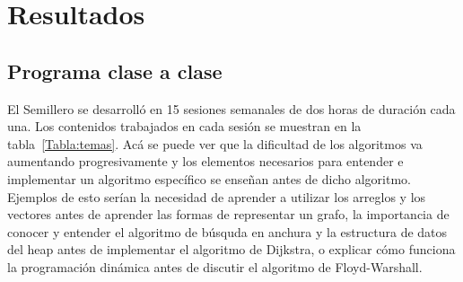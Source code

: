 \documentclass[conference]{IEEEtran}
\begin{document}
\section{Resultados}

\subsection{Programa clase a clase}
El Semillero se desarrolló en 15 sesiones semanales de dos horas de duración cada una. Los contenidos trabajados en cada sesión se muestran en la tabla~\ref{Tabla:temas}. Acá se puede ver que la dificultad de los algoritmos va aumentando progresivamente y los elementos necesarios para entender e implementar un algoritmo específico se enseñan antes de dicho algoritmo. Ejemplos de esto serían la necesidad de aprender a utilizar los arreglos y los vectores antes de aprender las formas de representar un grafo, la importancia de conocer y entender el algoritmo de búsquda en anchura y la estructura de datos del heap antes de implementar el algoritmo de Dijkstra, o explicar cómo funciona la programación dinámica antes de discutir el algoritmo de Floyd-Warshall.
\end{document}
